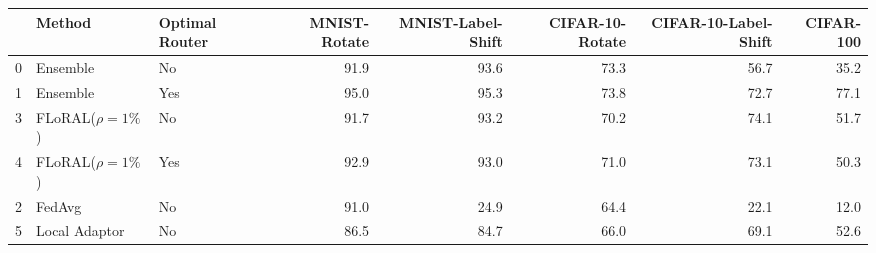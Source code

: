 \begin{tabular}{lllrrrrr}
\toprule
 & Method & Optimal Router & MNIST-Rotate & MNIST-Label-Shift & CIFAR-10-Rotate & CIFAR-10-Label-Shift & CIFAR-100 \\
\midrule
0 & Ensemble & No & 91.9 & 93.6 & 73.3 & 56.7 & 35.2 \\
1 & Ensemble & Yes & 95.0 & 95.3 & 73.8 & 72.7 & 77.1 \\
3 & FLoRAL($\rho=1\%$) & No & 91.7 & 93.2 & 70.2 & 74.1 & 51.7 \\
4 & FLoRAL($\rho=1\%$) & Yes & 92.9 & 93.0 & 71.0 & 73.1 & 50.3 \\
2 & FedAvg & No & 91.0 & 24.9 & 64.4 & 22.1 & 12.0 \\
5 & Local Adaptor & No & 86.5 & 84.7 & 66.0 & 69.1 & 52.6 \\
\bottomrule
\end{tabular}
